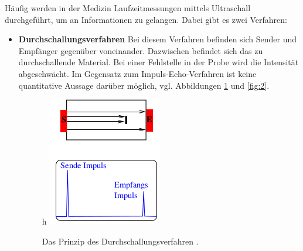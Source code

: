 Häufig werden in der Medizin Laufzeitmessungen mittels Ultraschall durchgeführt,
um an Informationen zu gelangen. Dabei gibt es zwei Verfahren:
\begin{itemize}
  \item \textbf{Durchschallungsverfahren}
  Bei diesem Verfahren befinden sich Sender und Empfänger gegenüber voneinander.
  Dazwischen befindet sich das zu durchschallende Material. Bei einer Fehlstelle
  in der Probe wird die Intensität abgeschwächt. Im Gegensatz zum Impuls-Echo-Verfahren
  ist keine quantitative Aussage darüber möglich, vgl. Abbildungen \ref{fig:1} und \ref{fig:2}.
  \begin{figure}{h}
    \centering
    \includegraphics[scale=0.5]{durchschall.png}
    \caption{Das Prinzip des Durchschallungsverfahren \cite{anleitung}.}
    \label{fig:1}
  \end{figure}


\end{itemize}

